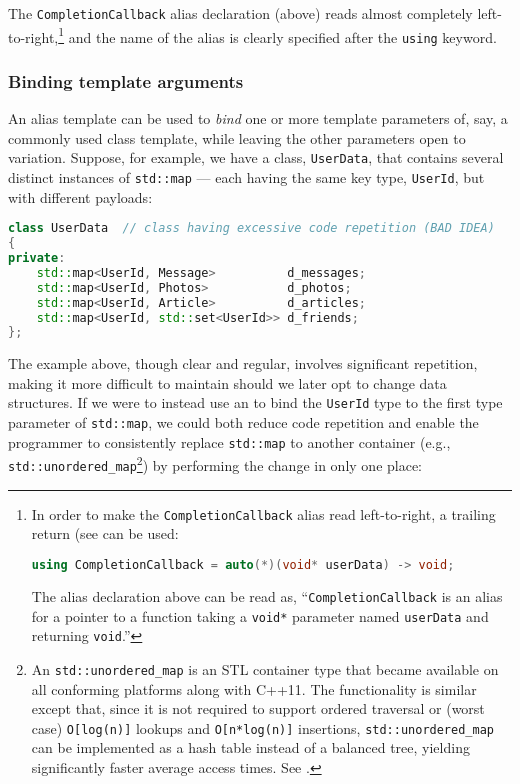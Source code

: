 \noindent The \lstinline!CompletionCallback! alias declaration (above) reads almost
completely left-to-right,{\cprotect\footnote{In order to make the
\lstinline!CompletionCallback! alias read left-to-right, a
  trailing return (see 
can be used:

  \begin{lstlisting}[language=C++, basicstyle={\ttfamily\footnotesize}]
  using CompletionCallback = auto(*)(void* userData) -> void;
  \end{lstlisting}\vspace*{-1ex}

\noindent The alias declaration above can be read as,
  ``\lstinline!CompletionCallback! is an alias for a pointer to a
  function taking a \lstinline!void*! parameter named \lstinline!userData! and
  returning \lstinline!void!.''}} and the name of the alias is clearly
specified after the \lstinline!using! keyword.

\subsubsection[Binding template arguments]{Binding template arguments}\label{binding-template-arguments}

An alias template can be used to \emph{bind} one or more template
parameters of, say, a commonly used class template, while leaving the
other parameters open to variation. Suppose, for example, we have a class, \lstinline!UserData!, that contains
several distinct instances of \lstinline!std::map! --- each
having the same key type, \lstinline!UserId!, but with different payloads:

\begin{lstlisting}[language=C++]
class UserData  // class having excessive code repetition (BAD IDEA)
{
private:
    std::map<UserId, Message>          d_messages;
    std::map<UserId, Photos>           d_photos;
    std::map<UserId, Article>          d_articles;
    std::map<UserId, std::set<UserId>> d_friends;
};
\end{lstlisting}

\noindent The example above, though clear and regular, involves significant
repetition, making it more difficult to maintain should we later opt to
change data structures. If we were to instead use an  to bind the \lstinline!UserId! type to the first type
parameter of \lstinline!std::map!, we could both reduce code repetition
and enable the programmer to consistently replace \lstinline!std::map!
to another container
(e.g., \lstinline!std::unordered_map!{\cprotect\footnote{An
\lstinline!std::unordered_map! is an STL container type that became
available on all conforming platforms along with C++11. The
functionality is similar except that, since it is not required to
support ordered traversal or (worst case) \lstinline!O[log(n)]! lookups
and \lstinline!O[n*log(n)]! insertions, \lstinline!std::unordered_map! can
be implemented as a hash table instead of a balanced tree, yielding
significantly faster average access times. See
  \cite{cppreferenceb}.}}) by performing the change in only
one place:

